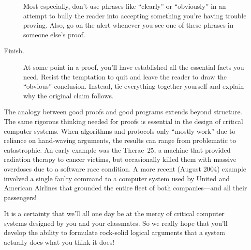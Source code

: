 \begin{description}
  Most especially, don't use phrases like ``clearly'' or ``obviously'' in
  an attempt to bully the reader into accepting something you're having
  trouble proving.  Also, go on the alert whenever you see one of these
  phrases in someone else's proof.

\item[Finish.]  At some point in a proof, you'll have established all the
essential facts you need.  Resist the temptation to quit and leave the
reader to draw the ``obvious'' conclusion.  Instead, tie everything
together yourself and explain why the original claim follows.

\end{description}

The analogy between good proofs and good programs extends beyond
structure.  The same rigorous thinking needed for proofs is essential in
the design of critical computer systems.  When algorithms and protocols
only ``mostly work'' due to reliance on hand-waving arguments, the results
can range from problematic to catastrophic.  An early example was the
Therac~25, a machine that provided radiation therapy to cancer victims,
but occasionally killed them with massive overdoses due to a software race
condition.  A more recent (August 2004) example involved a single faulty
command to a computer system used by United and American Airlines that
grounded the entire fleet of both companies---and all their passengers!

It is a certainty that we'll all one day be at the mercy of critical
computer systems designed by you and your classmates.  So we really
hope that you'll develop the ability to formulate rock-solid logical
arguments that a system actually does what you think it does!

\begin{problems}
\classproblems
{}

\homeworkproblems
{}
\end{problems}

\problemsection

\endinput
